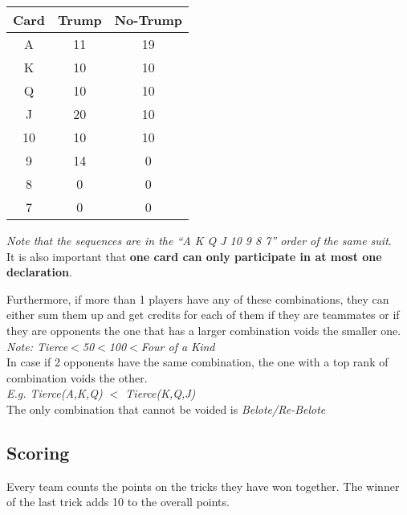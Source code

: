 \begin{center}
    \begin{tabular}{|c|c|c|}
        \hline
        \textbf{Card} & \textbf{Trump}  & \textbf{No-Trump}\\
        \hline
        A & 11 & 19\\
        \hline
        K & 10 & 10\\
        \hline
        Q & 10  & 10\\
        \hline
        J & 20 & 10\\
        \hline
        10 & 10 & 10\\
        \hline
        9 & 14 & 0\\
        \hline
        8 & 0 & 0\\
        \hline
        7 & 0 & 0\\
        \hline
    \end{tabular}
\end{center}
\textit{Note that the sequences are in the ``A K Q J 10 9 8 7'' order of the same suit}.\\
It is also important that \textbf{one card can only participate in at most one declaration}.

Furthermore, if more than 1 players have any of these combinations, they can either sum them up and get credits for each of them if they are teammates or if they are opponents the one that has a larger combination voids the smaller one.\\
\textit{Note: Tierce$<$50$<$100$<$Four of a Kind}\\
In case if 2 opponents have the same combination, the one with a top rank of combination voids the other.\\
\textit{E.g. Tierce(A,K,Q) $<$ Tierce(K,Q,J)}\\
The only combination that cannot be voided is \textit{Belote/Re-Belote}

\subsection{Scoring}
\hspace{\parindent} Every team counts the points on the tricks they have won together.
The winner of the last trick adds 10 to the overall points.\\

